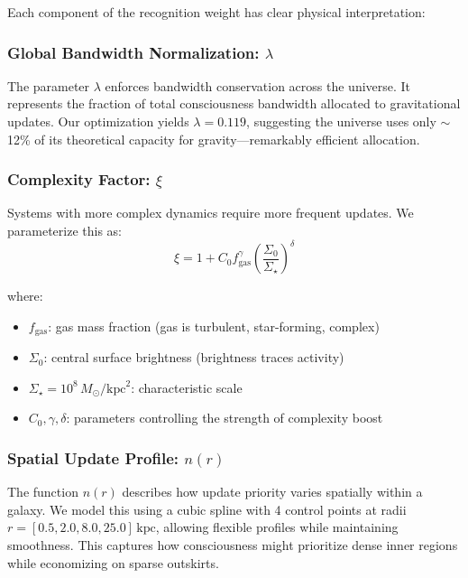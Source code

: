 \documentclass[twocolumn,prd,amsmath,amssymb,aps,superscriptaddress,nofootinbib]{revtex4-2}
\newcommand{\Msun}{M_{\odot}}
\newcommand{\kpc}{\text{kpc}}
\begin{document}
Each component of the recognition weight has clear physical interpretation:

\subsubsection{Global Bandwidth Normalization: $\lambda$}

The parameter $\lambda$ enforces bandwidth conservation across the universe. It represents the fraction of total consciousness bandwidth allocated to gravitational updates. Our optimization yields $\lambda = 0.119$, suggesting the universe uses only $\sim$12\% of its theoretical capacity for gravity---remarkably efficient allocation.

\subsubsection{Complexity Factor: $\xi$}

Systems with more complex dynamics require more frequent updates. We parameterize this as:
\begin{equation}
\xi = 1 + C_0 f_{\text{gas}}^\gamma \left(\frac{\Sigma_0}{\Sigma_\star}\right)^\delta
\label{eq:complexity}
\end{equation}

where:
\begin{itemize}
\item $f_{\text{gas}}$: gas mass fraction (gas is turbulent, star-forming, complex)
\item $\Sigma_0$: central surface brightness (brightness traces activity)
\item $\Sigma_\star = 10^8\,\Msun/\kpc^2$: characteristic scale
\item $C_0, \gamma, \delta$: parameters controlling the strength of complexity boost
\end{itemize}

\subsubsection{Spatial Update Profile: $n(r)$}

The function $n(r)$ describes how update priority varies spatially within a galaxy. We model this using a cubic spline with 4 control points at radii $r = [0.5, 2.0, 8.0, 25.0]\,\kpc$, allowing flexible profiles while maintaining smoothness. This captures how consciousness might prioritize dense inner regions while economizing on sparse outskirts.
\end{document}
